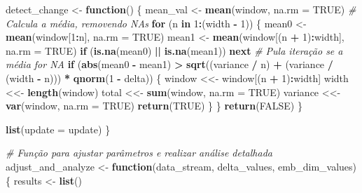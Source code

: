 \documentclass[
]{article}
\newenvironment{Shaded}{\begin{snugshade}}{\end{snugshade}}
\newcommand{\AttributeTok}[1]{\textcolor[rgb]{0.13,0.29,0.53}{#1}}
\newcommand{\CommentTok}[1]{\textcolor[rgb]{0.56,0.35,0.01}{\textit{#1}}}
\newcommand{\ConstantTok}[1]{\textcolor[rgb]{0.56,0.35,0.01}{#1}}
\newcommand{\ControlFlowTok}[1]{\textcolor[rgb]{0.13,0.29,0.53}{\textbf{#1}}}
\newcommand{\DecValTok}[1]{\textcolor[rgb]{0.00,0.00,0.81}{#1}}
\newcommand{\FunctionTok}[1]{\textcolor[rgb]{0.13,0.29,0.53}{\textbf{#1}}}
\newcommand{\NormalTok}[1]{#1}
\newcommand{\OtherTok}[1]{\textcolor[rgb]{0.56,0.35,0.01}{#1}}
\newcommand{\SpecialCharTok}[1]{\textcolor[rgb]{0.81,0.36,0.00}{\textbf{#1}}}
\begin{document}
\begin{Shaded}
\begin{Highlighting}[]
\NormalTok{  detect\_change }\OtherTok{\textless{}{-}} \ControlFlowTok{function}\NormalTok{() \{}
\NormalTok{    mean\_val }\OtherTok{\textless{}{-}} \FunctionTok{mean}\NormalTok{(window, }\AttributeTok{na.rm =} \ConstantTok{TRUE}\NormalTok{) }\CommentTok{\# Calcula a média, removendo NAs}
    \ControlFlowTok{for}\NormalTok{ (n }\ControlFlowTok{in} \DecValTok{1}\SpecialCharTok{:}\NormalTok{(width }\SpecialCharTok{{-}} \DecValTok{1}\NormalTok{)) \{}
\NormalTok{      mean0 }\OtherTok{\textless{}{-}} \FunctionTok{mean}\NormalTok{(window[}\DecValTok{1}\SpecialCharTok{:}\NormalTok{n], }\AttributeTok{na.rm =} \ConstantTok{TRUE}\NormalTok{)}
\NormalTok{      mean1 }\OtherTok{\textless{}{-}} \FunctionTok{mean}\NormalTok{(window[(n }\SpecialCharTok{+} \DecValTok{1}\NormalTok{)}\SpecialCharTok{:}\NormalTok{width], }\AttributeTok{na.rm =} \ConstantTok{TRUE}\NormalTok{)}
      \ControlFlowTok{if}\NormalTok{ (}\FunctionTok{is.na}\NormalTok{(mean0) }\SpecialCharTok{||} \FunctionTok{is.na}\NormalTok{(mean1)) }\ControlFlowTok{next} \CommentTok{\# Pula iteração se a média for NA}
      \ControlFlowTok{if}\NormalTok{ (}\FunctionTok{abs}\NormalTok{(mean0 }\SpecialCharTok{{-}}\NormalTok{ mean1) }\SpecialCharTok{\textgreater{}} \FunctionTok{sqrt}\NormalTok{((variance }\SpecialCharTok{/}\NormalTok{ n) }\SpecialCharTok{+}\NormalTok{ (variance }\SpecialCharTok{/}\NormalTok{ (width }\SpecialCharTok{{-}}\NormalTok{ n))) }\SpecialCharTok{*} \FunctionTok{qnorm}\NormalTok{(}\DecValTok{1} \SpecialCharTok{{-}}\NormalTok{ delta)) \{}
\NormalTok{        window }\OtherTok{\textless{}\textless{}{-}}\NormalTok{ window[(n }\SpecialCharTok{+} \DecValTok{1}\NormalTok{)}\SpecialCharTok{:}\NormalTok{width]}
\NormalTok{        width }\OtherTok{\textless{}\textless{}{-}} \FunctionTok{length}\NormalTok{(window)}
\NormalTok{        total }\OtherTok{\textless{}\textless{}{-}} \FunctionTok{sum}\NormalTok{(window, }\AttributeTok{na.rm =} \ConstantTok{TRUE}\NormalTok{)}
\NormalTok{        variance }\OtherTok{\textless{}\textless{}{-}} \FunctionTok{var}\NormalTok{(window, }\AttributeTok{na.rm =} \ConstantTok{TRUE}\NormalTok{)}
        \FunctionTok{return}\NormalTok{(}\ConstantTok{TRUE}\NormalTok{)}
\NormalTok{      \}}
\NormalTok{    \}}
    \FunctionTok{return}\NormalTok{(}\ConstantTok{FALSE}\NormalTok{)}
\NormalTok{  \}}
  
  \FunctionTok{list}\NormalTok{(}\AttributeTok{update =}\NormalTok{ update)}
\NormalTok{\}}

\CommentTok{\# Função para ajustar parâmetros e realizar análise detalhada}
\NormalTok{adjust\_and\_analyze }\OtherTok{\textless{}{-}} \ControlFlowTok{function}\NormalTok{(data\_stream, delta\_values, emb\_dim\_values) \{}
\NormalTok{  results }\OtherTok{\textless{}{-}} \FunctionTok{list}\NormalTok{()}
  

\end{Highlighting}
\end{Shaded}
\end{document}
